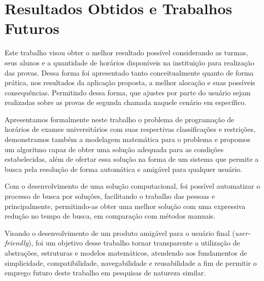\chapter{Resultados Obtidos e Trabalhos Futuros}
\label{cap:resultados}

Este trabalho visou obter o melhor resultado possível considerando as turmas, seus alunos e a quantidade de horários disponíveis na instituição para realização das provas. Dessa forma foi apresentado tanto conceitualmente quanto de forma prática, nos resultados da aplicação proposta, a melhor alocação e suas possíveis consequências. Permitindo dessa forma, que ajustes por parte do usuário sejam realizadas sobre as provas de segunda chamada naquele cenário em específico.

Apresentamos formalmente neste trabalho o problema de programação de horários de exames universitários com suas respectivas classificações e restrições, demonstramos também a modelagem matemática para o problema e propomos um algoritmo capaz de obter uma solução adequada para as condições estabelecidas, além de ofertar essa solução na forma de um sistema que permite a busca pela resolução de forma automática e amigável para qualquer usuário.


Com o desenvolvimento de uma solução computacional, foi possível automatizar o processo de busca por soluções, facilitando o trabalho das pessoas e principalmente, permitindo-as obter uma melhor solução com uma expressiva redução no tempo de busca, em comparação com métodos manuais. 

Visando o desenvolvimento de um produto amigável para o usuário final (\emph{user-friendly}), foi um objetivo desse trabalho tornar transparente a utilização de abstrações, estruturas e modelos matemáticos, atendendo aos fundamentos de simplicidade, compatibilidade, navegabilidade e reusabilidade a fim de permitir o emprego futuro deste trabalho em pesquisas de natureza similar.


